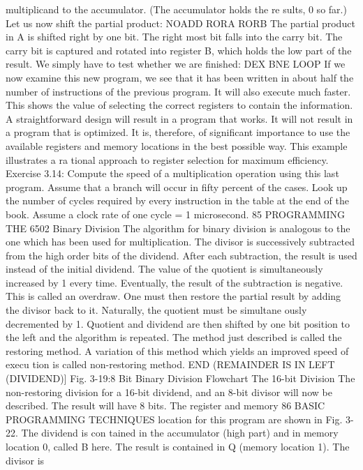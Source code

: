 multiplicand to the accumulator. (The accumulator holds the re
sults, 0 so far.)
Let us now shift the partial product:
NOADD RORA
RORB
The partial product in A is shifted right by one bit. The right
most bit falls into the carry bit. The carry bit is captured and
rotated into register B, which holds the low part of the result.
We simply have to test whether we are finished:
DEX
BNE LOOP
If we now examine this new program, we see that it has been
written in about half the number of instructions of the previous
program. It will also execute much faster. This shows the value of
selecting the correct registers to contain the information.
A straightforward design will result in a program that works. It
will not result in a program that is optimized. It is, therefore, of
significant importance to use the available registers and memory
locations in the best possible way. This example illustrates a ra
tional approach to register selection for maximum efficiency.
Exercise 3.14: Compute the speed of a multiplication operation
using this last program. Assume that a branch will occur in fifty
percent of the cases. Look up the number of cycles required by every
instruction in the table at the end of the book. Assume a clock rate
of one cycle = 1 microsecond.
85
PROGRAMMING THE 6502
Binary Division
The algorithm for binary division is analogous to the one which
has been used for multiplication. The divisor is successively
subtracted from the high order bits of the dividend. After each
subtraction, the result is used instead of the initial dividend. The
value of the quotient is simultaneously increased by 1 every time.
Eventually, the result of the subtraction is negative. This is called
an overdraw. One must then restore the partial result by adding
the divisor back to it. Naturally, the quotient must be simultane
ously decremented by 1. Quotient and dividend are then shifted
by one bit position to the left and the algorithm is repeated.
The method just described is called the restoring method. A
variation of this method which yields an improved speed of execu
tion is called non-restoring method.
END (REMAINDER IS IN LEFT (DIVIDEND)]
Fig. 3-19:8 Bit Binary Division Flowchart
The 16-bit Division
The non-restoring division for a 16-bit dividend, and an 8-bit divisor
will now be described. The result will have 8 bits. The register and memory
86
BASIC PROGRAMMING TECHNIQUES
location for this program are shown in Fig. 3-22. The dividend is con
tained in the accumulator (high part) and in memory location 0, called B
here. The result is contained in Q (memory location 1). The divisor is
